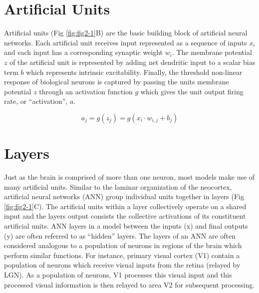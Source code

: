 \documentclass{templates/ucdenverthesis}
\begin{document}
\hypertarget{sec:artificialunits}{%
\section{Artificial Units}\label{sec:artificialunits}}

Artificial units (Fig \ref{fig:fig2-1}B) are the basic building block of artificial neural networks. Each artificial unit receives input represented as a sequence of inputs \(x_i\) and each input has a corresponding synaptic weight \(w_i\). The membrane potential \(z\) of the artificial unit is represented by adding net dendritic input to a scalar bias term \(b\) which represents intrinsic excitability. Finally, the threshold non-linear response of biological neurons is captured by passing the units membrane potential \(z\) through an activation function \(g\) which gives the unit output firing rate, or ``activation'', \(a\).

\[
a_j = g(z_j) = g(x_i \cdot w_{i,j} + b_j)
\]

\hypertarget{sec:layers}{%
\section{Layers}\label{sec:layers}}

Just as the brain is comprised of more than one neuron, most models make use of many artificial units. Similar to the laminar organization of the neocortex, artificial neural networks (ANN) group individual units together in layers (Fig \ref{fig:fig2-1}C). The artificial units within a layer collectively operate on a shared input and the layers output consists the collective activations of its constituent artificial units. ANN layers in a model between the inputs (x) and final outputs (y) are often referred to as ``hidden'' layers. The layers of an ANN are often considered analogous to a population of neurons in regions of the brain which perform similar functions. For instance, primary visual cortex (V1) contain a population of neurons which receive visual inputs from the retina (relayed by LGN). As a population of neurons, V1 processes this visual input and this processed visual information is then relayed to area V2 for subsequent processing.
\end{document}

